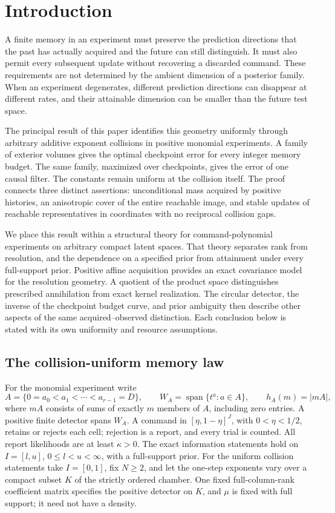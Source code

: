 \section{Introduction}
A finite memory in an experiment must preserve the prediction directions
that the past has actually acquired and the future can still distinguish.
It must also permit every subsequent update without recovering a
discarded command. These requirements are not determined by the
ambient dimension of a posterior family. When an experiment degenerates,
different prediction directions can disappear at different rates, and
their attainable dimension can be smaller than the future test space.

The principal result of this paper identifies this geometry uniformly
through arbitrary additive exponent collisions in positive monomial
experiments. A family of exterior volumes gives the optimal checkpoint
error for every integer memory budget. The same family, maximized over
checkpoints, gives the error of one causal filter. The constants remain
uniform at the collision itself. The proof connects three distinct
assertions: unconditional mass acquired by positive histories, an
anisotropic cover of the entire reachable image, and stable updates of
reachable representatives in coordinates with no reciprocal collision
gaps.

We place this result within a structural theory for command-polynomial
experiments on arbitrary compact latent spaces. That theory separates
rank from resolution, and the dependence on a specified prior from
attainment under every full-support prior. Positive affine acquisition
provides an exact covariance model for the resolution geometry. A
quotient of the product space distinguishes prescribed annihilation
from exact kernel realization. The circular detector, the inverse of
the checkpoint budget curve, and prior ambiguity then describe other
aspects of the same acquired--observed distinction. Each conclusion
below is stated with its own uniformity and resource assumptions.

\subsection{The collision-uniform memory law}

For the monomial experiment write
\[
 A=\{0=a_0<a_1<\cdots<a_{r-1}=D\},\qquad
 W_A=\operatorname{span}\{t^a:a\in A\},\qquad h_A(m)=|mA|,
\]
where $mA$ consists of sums of exactly $m$ members of $A$, including
zero entries. A positive finite detector spans $W_A$. A command in
$[\eta,1-\eta]^J$, with $0<\eta<1/2$, retains or rejects each cell;
rejection is a report, and every trial is counted. All report
likelihoods are at least $\kappa>0$. The exact information statements
hold on $I=[l,u]$, $0\le l<u<\infty$, with a full-support prior.
For the uniform collision statements take $I=[0,1]$, fix $N\ge2$,
and let the one-step exponents vary over a compact subset $K$ of the
strictly ordered chamber. One fixed full-column-rank coefficient matrix
specifies the positive detector on $K$, and $\mu$ is fixed with full
support; it need not have a density.

